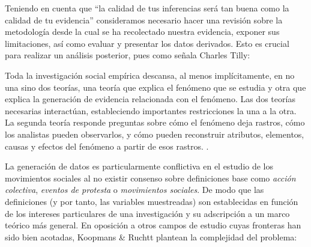 \documentclass[letterpaper, 11pt]{book}
\theoremstyle{definition}
\theoremstyle{remark}
\begin{document}
Teniendo en cuenta que ``la calidad de tus inferencias será tan buena como la calidad de tu evidencia'' \citep[89]{2010_Franzosi_QNA} consideramos necesario hacer una revisión sobre la metodología desde la cual se ha recolectado nuestra evidencia, exponer sus limitaciones, así como evaluar y presentar los datos derivados. Esto es crucial para realizar un análisis posterior, pues como señala Charles Tilly:

\begin{center}
    \begin{minipage}{0.9\linewidth}
        {\setlength{\parindent}{12pt}\small
        Toda la investigación social empírica descansa, al menos implícitamente, en no una sino dos teorías, una teoría que explica el fenómeno que se estudia y otra que explica la generación de evidencia relacionada con el fenómeno. Las dos teorías necesarias interactúan, estableciendo importantes restricciones la una a la otra. La segunda teoría responde preguntas sobre cómo el fenómeno deja rastros, cómo los analistas pueden observarlos, y cómo pueden reconstruir atributos, elementos, causas y efectos del fenómeno a partir de esos rastros. \citep[248]{2002_Tilly_EventCatalogsAsTheories}.
        }
    \end{minipage}
\end{center}


La generación de datos es particularmente conflictiva en el estudio de los movimientos sociales al no existir consenso sobre definiciones base como \emph{acción colectiva}, \emph{eventos de protesta} o \emph{movimientos sociales}. De modo que las definiciones (y por tanto, las variables muestreadas) son establecidas en función de los intereses particulares de una investigación y su adscripción a un marco teórico más general. 
En oposición a otros campos de estudio cuyas fronteras han sido bien acotadas, Koopmans \& Ruchtt plantean la complejidad del problema:
\end{document}
